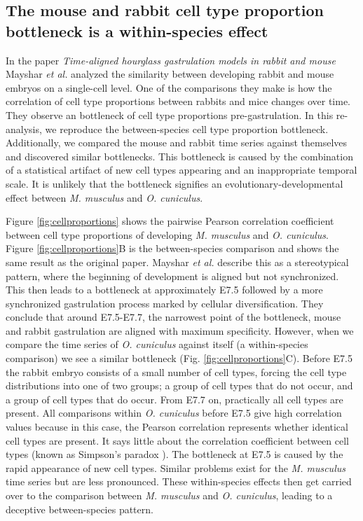 \subsection{The mouse and rabbit cell type proportion bottleneck is a within-species effect} \label{subsection:mayshar}

In the paper \textit{Time-aligned hourglass gastrulation models in rabbit and mouse}\cite{Mayshar2023} Mayshar \textit{et al.} analyzed the similarity between developing rabbit and mouse embryos on a single-cell level. One of the comparisons they make is how the correlation of cell type proportions between rabbits and mice changes over time. They observe an  bottleneck of cell type proportions pre-gastrulation. In this re-analysis, we reproduce the between-species cell type proportion bottleneck. Additionally, we compared the mouse and rabbit time series against themselves and discovered similar bottlenecks. This bottleneck is caused by the combination of a statistical artifact of new cell types appearing and an inappropriate temporal scale. It is unlikely that the bottleneck signifies an evolutionary-developmental effect between \textit{M. musculus} and \textit{O. cuniculus}.

Figure \ref{fig:cellproportions} shows the pairwise Pearson correlation coefficient between cell type proportions of developing \textit{M. musculus} and \textit{O. cuniculus}. Figure \ref{fig:cellproportions}B is the between-species comparison and shows the same result as the original paper. Mayshar \textit{et al.} describe this as a stereotypical pattern, where the beginning of development is aligned but not synchronized. This then leads to a bottleneck at approximately E7.5 followed by a more synchronized gastrulation process marked by cellular diversification. They conclude that around E7.5-E7.7, the narrowest point of the bottleneck, mouse and rabbit gastrulation are aligned with maximum specificity. However, when we compare the time series of \textit{O. cuniculus} against itself (a within-species comparison) we see a similar bottleneck (Fig. \ref{fig:cellproportions}C). Before E7.5 the rabbit embryo consists of a small number of cell types, forcing the cell type distributions into one of two groups; a group of cell types that do not occur, and a group of cell types that do occur. From E7.7 on, practically all cell types are present. All comparisons within \textit{O. cuniculus} before E7.5 give high correlation values because in this case, the Pearson correlation represents whether identical cell types are present. It says little about the correlation coefficient between cell types (known as Simpson's paradox \cite{Saccenti2023}). The bottleneck at E7.5 is caused by the rapid appearance of new cell types. Similar problems exist for the \textit{M. musculus} time series but are less pronounced. These within-species effects then get carried over to the comparison between \textit{M. musculus} and \textit{O. cuniculus}, leading to a deceptive between-species pattern.

